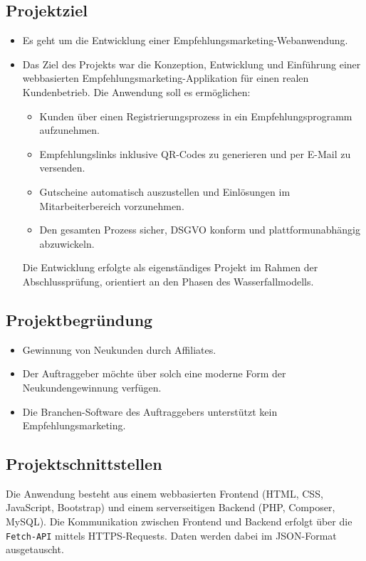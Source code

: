 \subsection{Projektziel}
\label{sec:Projektziel}
\begin{itemize}
    \item Es geht um die Entwicklung einer Empfehlungsmarketing-Webanwendung.
    \item Das Ziel des Projekts war die Konzeption, Entwicklung und Einführung einer webbasierten Empfehlungsmarketing-Applikation für einen realen Kundenbetrieb.
          Die Anwendung soll es ermöglichen:
          \begin{itemize}
              \item Kunden über einen Registrierungsprozess in ein Empfehlungsprogramm aufzunehmen.
              \item Empfehlungslinks inklusive QR-Codes zu generieren und per E-Mail zu versenden.
              \item Gutscheine automatisch auszustellen und Einlösungen im Mitarbeiterbereich vorzunehmen.
              \item Den gesamten Prozess sicher, \acs{DSGVO} konform und plattformunabhängig abzuwickeln.
          \end{itemize}
          Die Entwicklung erfolgte als eigenständiges Projekt im Rahmen der Abschlussprüfung, orientiert an den Phasen des Wasserfallmodells.
\end{itemize}

\subsection{Projektbegründung}
\label{sec:Projektbegruendung}
\begin{itemize}
    \item Gewinnung von Neukunden durch Affiliates.
    \item Der Auftraggeber möchte über solch eine moderne Form der Neukundengewinnung verfügen.
    \item Die Branchen-Software des Auftraggebers unterstützt kein Empfehlungsmarketing.
\end{itemize}


\subsection{Projektschnittstellen}
\label{sec:Projektschnittstellen}
Die Anwendung besteht aus einem webbasierten Frontend (\ac{HTML}, \ac{CSS}, JavaScript, Bootstrap) und einem serverseitigen Backend (\ac{PHP}, Composer, MySQL).
Die Kommunikation zwischen Frontend und Backend erfolgt über die \texttt{Fetch-API} mittels \ac{HTTPS}-Requests.
Daten werden dabei im \ac{JSON}-Format ausgetauscht.

